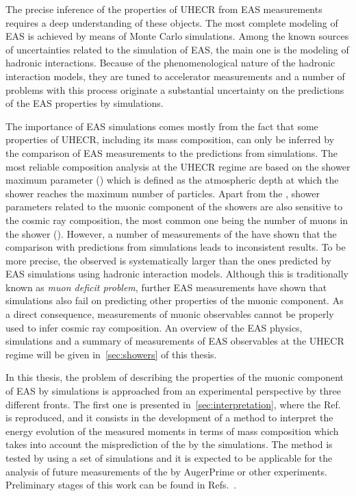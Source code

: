 The precise inference of the properties of UHECR
from EAS measurements requires a deep understanding
of these objects. The most complete modeling of EAS is
achieved by means of Monte Carlo simulations.
Among the known sources of uncertainties related to the
simulation of EAS, the main one is the modeling
of hadronic interactions. 
Because of the phenomenological nature of the hadronic interaction models,
they are tuned to accelerator measurements
and a number of problems with this process originate a substantial
uncertainty on the predictions of the EAS properties by simulations.

The importance of EAS simulations comes mostly from the fact that
some properties of UHECR, including its mass composition,
can only be inferred by the comparison of EAS measurements
to the predictions from simulations.
The most reliable composition analysis at the UHECR regime
are based on the shower maximum parameter (\xmax) which is defined
as the atmospheric depth at which the shower reaches the maximum
number of particles. Apart from the \xmax, shower parameters related
to the muonic component of the showers are also sensitive to
the cosmic ray composition, the most common one being the number
of muons in the shower (\nmu). However, a number of measurements of the \nmu
have shown that the comparison with predictions from simulations leads
to inconsistent results. To be more precise, the \nmu observed is systematically
larger than the ones predicted by EAS simulations using hadronic interaction
models. Although this is traditionally known as \emph{muon deficit problem},
further EAS measurements have shown
that simulations also fail on predicting other properties of the muonic component.
As a direct consequence, measurements of muonic observables cannot be
properly used to infer cosmic ray composition.  
An overview of the EAS physics, simulations and a summary of measurements
of EAS observables at the UHECR regime will be given in~\cref{sec:showers}
of this thesis. \newline

In this thesis, the problem of describing the properties of the muonic component of EAS
by simulations is approached from an experimental perspective by three different fronts.
The first one is presented in~\cref{sec:interpretation},
where the Ref.~\cite{Prado:2016akv} is reproduced,
and it consists in the development of a method to interpret the energy evolution
of the measured \nmu moments in terms of mass composition which takes into account
the misprediction of the \nmu by the simulations. The method is tested by using
a set of simulations and it is expected to be applicable for the analysis
of future measurements of the \nmu by AugerPrime or other experiments.
Preliminary stages of this work can be found in Refs.~\cite{Prado:2015iaz,GAP2014,GAP2015}.

